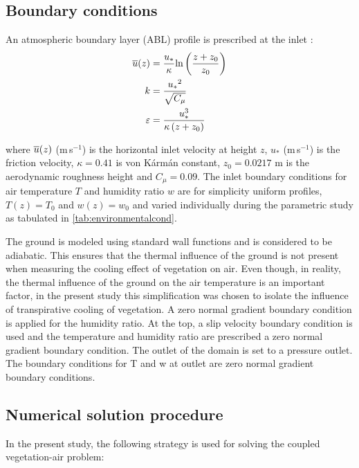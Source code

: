 \subsection{	Boundary conditions}

An atmospheric boundary layer (ABL) profile is prescribed at the inlet \citep{Richards1993}:
\begin{align}
\overline{u}(z) &= \frac{{{u_*}}}{\kappa }{\text{ln}}\left( {\frac{{z + {z_0}}}{{{z_0}}}} \right) \\
k &= \frac{{{u_*}^2}}{{\sqrt {{C_\mu }} }} \\
\varepsilon  &= \frac{{u_*^3}}{{\kappa \left( {z + {z_0}} \right)}}
\end{align}

where $\overline{u}(z)$ (m\,s$^{-1}$) is the horizontal inlet velocity at height $z$, $u_*$ (m\,s$^{-1}$) is the friction velocity, $\kappa=0.41$ is von K\'arm\'an constant, $z_0=\num{0.0217}$ m is the aerodynamic roughness height and $C_{\mu}=0.09$. The inlet boundary conditions for air temperature $T$ and humidity ratio $w$ are for simplicity uniform profiles, $T(z)=T_0$ and $w(z)=w_0$ and varied individually during the parametric study as tabulated in \cref{tab:environmentalcond}.

The ground is modeled using standard wall functions and is considered to be adiabatic. This ensures that the thermal influence of the ground is not present when measuring the cooling effect of vegetation on air. Even though, in reality, the thermal influence of the ground on the air temperature is an important factor, in the present study this simplification was chosen to isolate the influence of transpirative cooling of vegetation. A zero normal gradient boundary condition is applied for the humidity ratio. At the top, a slip velocity boundary condition is used and the temperature and humidity ratio are prescribed a zero normal gradient boundary condition. The outlet of the domain is set to a pressure outlet. The boundary conditions for T and w at outlet are zero normal gradient boundary conditions. 

\subsection{Numerical solution procedure}

In the present study, the following strategy is used for solving the coupled vegetation-air problem:

